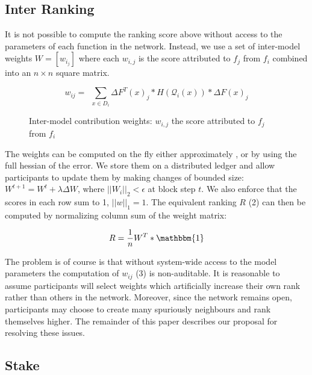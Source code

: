 \documentclass{article}
\begin{document}
\subsection{Inter Ranking}

It is not possible to compute the ranking score above without access to the parameters of each function in the network. Instead, we use a set of inter-model weights $W = [w_{i_j}]$ where each $w_{i,j}$ is the score attributed to $f_j$ from $f_i$ combined into an $n \times n$ square matrix.
\bigskip

\begin{equation}
 w_{ij} = \ \ \sum_{x \in D_i} \Delta F^T(x)_j * H(\mathcal{Q}_i(x)) * \Delta F(x)_j
\end{equation}

 \begin{figure}[H]
    \centering
    \hspace*{-2cm}
    
    \caption{Inter-model contribution weights: $w_{i,j}$ the score attributed to $f_j$ from $f_i$}
\end{figure}{}

The weights can be computed on the fly either approximately \cite{yu2017nisp}, or by using the full hessian of the error. We store them on a distributed ledger and allow participants to update them by making changes of bounded size: $W^{t+1}= W^t + \lambda \Delta W$, where $||W_i||_2 < \epsilon$ at block step $t$. We also enforce that the scores in each row sum to 1, $||w||_1 = 1$. The equivalent ranking $R$ (2) can then be computed by normalizing column sum of the weight matrix:
\bigskip

\begin{equation}
R = \frac{1}{n} W^T * \mathbbm{1}
\end{equation}

The problem is of course is that without system-wide access to the model parameters the computation of $w_{ij}$ (3) is non-auditable. It is reasonable to assume participants will select weights which artificially increase their own rank rather than others in the network. Moreover, since the network remains open, participants may choose to create many spuriously neighbours and rank themselves higher. The remainder of this paper describes our proposal for resolving these issues.
\bigskip

\subsection{Stake}
\end{document}
